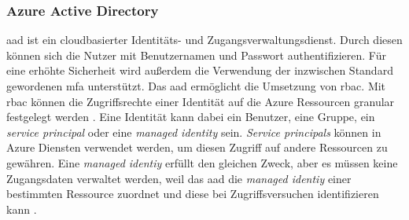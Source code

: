 \subsubsection{Azure Active Directory} \label{subsec:grundlagen:azure:sicherheitUndDatenschutz:aad}
\ac{aad} ist ein cloudbasierter Identitäts- und Zugangsverwaltungsdienst. Durch diesen können sich die Nutzer mit Benutzernamen und Passwort authentifizieren. Für eine erhöhte Sicherheit wird außerdem die Verwendung der inzwischen Standard gewordenen \ac{mfa} unterstützt. Das \ac{aad} ermöglicht die Umsetzung von \ac{rbac}. Mit \ac{rbac} können die Zugriffsrechte einer Identität auf die Azure Ressourcen granular festgelegt werden \cite{stefanovic_azure_2021}. Eine Identität kann dabei ein Benutzer, eine Gruppe, ein \textit{service principal} oder eine \textit{managed identity} sein. \textit{Service principals} können in Azure Diensten verwendet werden, um diesen Zugriff auf andere Ressourcen zu gewähren. Eine \textit{managed identiy} erfüllt den gleichen Zweck, aber es müssen keine Zugangsdaten verwaltet werden, weil das \ac{aad} die \textit{managed identiy} einer bestimmten Ressource zuordnet und diese bei Zugriffsversuchen identifizieren kann \cite{copeland_security_2021}.

